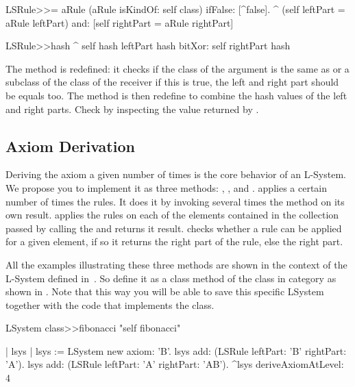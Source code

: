 
\begin{method}
LSRule>>= aRule 
   (aRule isKindOf: self class) ifFalse: [^false].
   ^ (self leftPart = aRule leftPart) and: [self rightPart = aRule rightPart]
\end{method}

\begin{method}
LSRule>>hash
   ^ self hash leftPart hash bitXor: self rightPart hash
\end{method}

The method \ct{=} is redefined: it checks if the class of the argument
is the same as or a subclass of the class of the receiver if this is
true, the left and right part should be equals too. The 
method is then redefine to combine the hash values of the left and
right parts. Check by inspecting the value returned by .


\subsection{Axiom Derivation}
Deriving the axiom a given number of times is the core behavior of an
L-System. We propose you to implement it as three methods:
, , and
.   applies a certain number
of times the rules. It does it by invoking several times the method
 on its own result.  applies the 
rules on each of the elements contained in the collection passed by
calling the  and returns it
result.  checks whether a rule can be applied for a
given element, if so it returns the right part of the rule, else the
right part.  

All the examples illustrating these three methods are shown in the
context of the L-System defined in~.  So define it
as a class method of the class  in category
 as shown in . Note that this way you will be able to save this
specific LSystem together with the code that implements the 
class.

\begin{method}\label{met:fibo}
LSystem class>>fibonacci
   "self fibonacci"

   | lsys |
   lsys := LSystem  new axiom: 'B'.
   lsys add: (LSRule leftPart: 'B' rightPart: 'A').
   lsys add: (LSRule leftPart: 'A' rightPart: 'AB').
   ^lsys deriveAxiomAtLevel: 4
\end{method}


